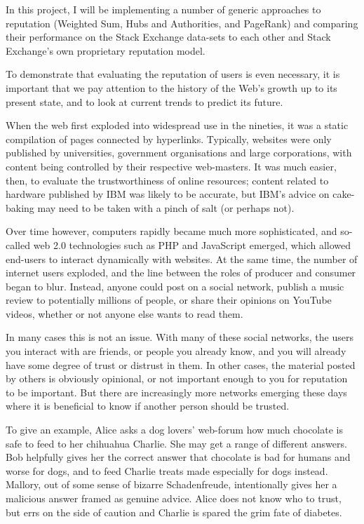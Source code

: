 \documentclass[]{final_report}
\begin{document}
In this project, I will be implementing a number of generic approaches to reputation (Weighted Sum, Hubs and Authorities, and PageRank) and comparing their performance on the Stack Exchange data-sets to each other and Stack Exchange's own proprietary reputation model.

To demonstrate that evaluating the reputation of users is even necessary, it is important that we pay attention to the history of the Web's growth up to its present state, and to look at current trends to predict its future.

When the web first exploded into widespread use in the nineties, it was a static compilation of pages connected by hyperlinks. Typically, websites were only published by universities, government organisations and large corporations, with content being controlled by their respective web-masters. It was much easier, then, to evaluate the trustworthiness of online resources; content related to hardware published by IBM was likely to be accurate, but IBM's advice on cake-baking may need to be taken with a pinch of salt (or perhaps not).

Over time however, computers rapidly became much more sophisticated, and so-called web 2.0 technologies such as PHP and JavaScript emerged, which allowed end-users to interact dynamically with websites. At the same time, the number of internet users exploded, and the line between the roles of producer and consumer began to blur. Instead, anyone could post on a social network, publish a music review to potentially millions of people, or share their opinions on YouTube videos, whether or not anyone else wants to read them.

In many cases this is not an issue. With many of these social networks, the users you interact with are friends, or people you already know, and you will already have some degree of trust or distrust in them. In other cases, the material posted by others is obviously opinional, or not important enough to you for reputation to be important. But there are increasingly more networks emerging these days where it is beneficial to know if another person should be trusted.

To give an example, Alice asks a dog lovers' web-forum how much chocolate is safe to feed to her chihuahua Charlie. She may get a range of different answers. Bob helpfully gives her the correct answer that chocolate is bad for humans and worse for dogs, and to feed Charlie treats made especially for dogs instead. Mallory, out of some sense of bizarre Schadenfreude, intentionally gives her a malicious answer framed as genuine advice. Alice does not know who to trust, but errs on the side of caution and Charlie is spared the grim fate of diabetes.
\end{document}
